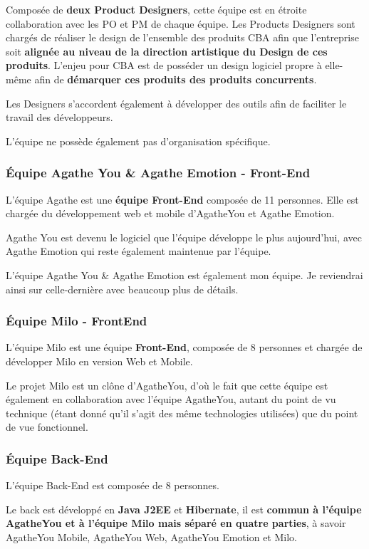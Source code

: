 \documentclass{article}
\begin{document}
Composée de \textbf{deux Product Designers}, cette équipe est en étroite collaboration avec les PO et PM de chaque équipe. Les Products Designers sont chargés de réaliser le design de l'ensemble des produits CBA afin que l'entreprise soit \textbf{alignée au niveau de la direction artistique du Design de ces produits}. L'enjeu pour CBA est de posséder un design logiciel propre à elle-même afin de \textbf{démarquer ces produits des produits concurrents}.

Les Designers s'accordent également à développer des outils afin de faciliter le travail des développeurs.

L'équipe ne possède également pas d'organisation spécifique.

\subsubsection{Équipe Agathe You \& Agathe Emotion - Front-End}

L'équipe Agathe est une \textbf{équipe Front-End} composée de 11 personnes. Elle est chargée du développement web et mobile d'AgatheYou et Agathe Emotion.

Agathe You est devenu le logiciel que l'équipe développe le plus aujourd'hui, avec Agathe Emotion qui reste également maintenue par l'équipe.

L'équipe Agathe You \& Agathe Emotion est également mon équipe. Je reviendrai ainsi sur celle-dernière avec beaucoup plus de détails.

\subsubsection{Équipe Milo - FrontEnd}
L'équipe Milo est une équipe \textbf{Front-End}, composée de 8 personnes et chargée de développer Milo en version Web et Mobile.

Le projet Milo est un clône d'AgatheYou, d'où le fait que cette équipe est également en collaboration avec l'équipe AgatheYou, autant du point de vu technique (étant donné qu'il s'agit des même technologies utilisées) que du point de vue fonctionnel.

\subsubsection{Équipe Back-End}
L'équipe Back-End est composée de 8 personnes.

Le back est développé en \textbf{Java J2EE} et \textbf{Hibernate}, il est \textbf{commun à l'équipe AgatheYou et à l'équipe Milo mais séparé en quatre parties}, à savoir AgatheYou Mobile, AgatheYou Web, AgatheYou Emotion et Milo.
\end{document}

